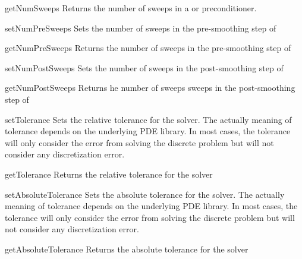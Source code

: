\begin{methoddesc}[SolverOptions]{getNumSweeps}{}
Returns the number of sweeps in a \JACOBI or \GAUSSSEIDEL preconditioner.
\end{methoddesc}

\begin{methoddesc}[SolverOptions]{setNumPreSweeps}{}
Sets the number of sweeps in the pre-smoothing step of \AMG
\end{methoddesc}

\begin{methoddesc}[SolverOptions]{getNumPreSweeps}{}
Returns the number of sweeps in the pre-smoothing step of \AMG
\end{methoddesc}

\begin{methoddesc}[SolverOptions]{setNumPostSweeps}{}
Sets the number of sweeps in the post-smoothing step of \AMG
\end{methoddesc}

\begin{methoddesc}[SolverOptions]{getNumPostSweeps}{}
Returns he number of sweeps sweeps in the post-smoothing step of \AMG
\end{methoddesc}

\begin{methoddesc}[SolverOptions]{setTolerance}{}
Sets the relative tolerance for the solver. The actually meaning of tolerance depends 
on the underlying PDE library. In most cases, the tolerance
will only consider the error from solving the discrete problem but will
not consider any discretization error.
\end{methoddesc}

\begin{methoddesc}[SolverOptions]{getTolerance}{}
Returns the relative tolerance for the solver
\end{methoddesc}

\begin{methoddesc}[SolverOptions]{setAbsoluteTolerance}{}
Sets the absolute tolerance for the solver. The actually meaning of tolerance depends 
on the underlying PDE library. In most cases, the tolerance
will only consider the error from solving the discrete problem but will
not consider any discretization error.
\end{methoddesc}

\begin{methoddesc}[SolverOptions]{getAbsoluteTolerance}{}
Returns the absolute tolerance for the solver
\end{methoddesc}


